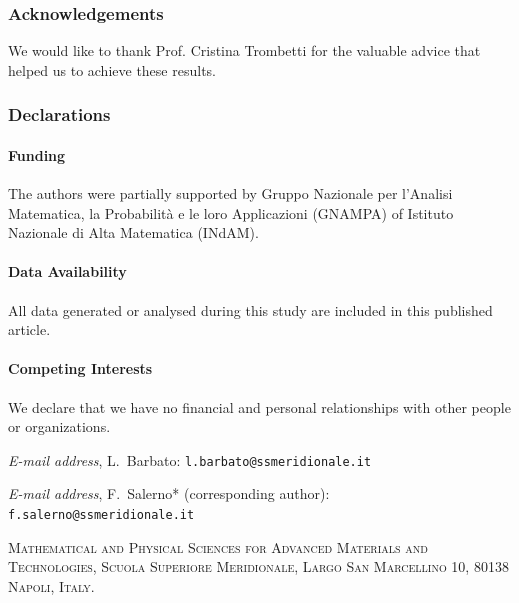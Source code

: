 \documentclass[12pt]{article}
\makeatletter
\theoremstyle{definition}
\theoremstyle{plain}
\theoremstyle{definition}
\newcommand{\Addresses}{{%
\bigskip 
  
   \medskip

    \textit{E-mail address}, L.~Barbato: \texttt{l.barbato@ssmeridionale.it} 
  
   \medskip 
   
     \textit{E-mail address}, F.~Salerno* (corresponding author): \texttt{f.salerno@ssmeridionale.it} 
   \medskip 
   



 \textsc{Mathematical and Physical Sciences for Advanced Materials and Technologies, Scuola Superiore Meridionale, Largo San Marcellino 10, 80138 Napoli, Italy.}
 
 
 \par\nopagebreak 

}}
\makeatother
\begin{document}
\subsubsection*{Acknowledgements}
We would like to thank Prof. Cristina Trombetti for the valuable advice that helped us to achieve these results.
\subsubsection*{Declarations}

\paragraph{Funding}
The authors were partially supported by Gruppo Nazionale per l’Analisi Matematica, la Probabilità e le loro Applicazioni
(GNAMPA) of Istituto Nazionale di Alta Matematica (INdAM).   

\paragraph{Data Availability} All data generated or analysed during this study are included in this published article.
	
\paragraph{Competing Interests} We declare that we have no financial and personal relationships with other people or organizations.








\Addresses
\end{document}
